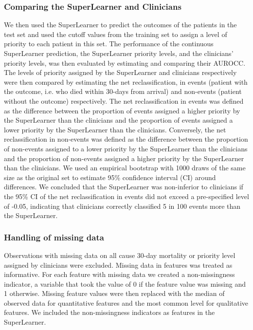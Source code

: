 \documentclass[10pt,letterpaper]{article}\usepackage[]{graphicx}\usepackage[]{color}
\begin{document}
\subsubsection*{Comparing the SuperLearner and Clinicians}
We then used the SuperLearner to predict the outcomes of the patients in the
test set and used the cutoff values from the training set to assign a level of
priority to each patient in this set. The performance of the continuous
SuperLearner prediction, the SuperLearner priority levels, and the clinicians'
priority levels, was then evaluated by estimating and comparing their
AUROCC. The levels of priority assigned by the SuperLearner and clinicians
respectively were then compared by estimating the net reclassification, in
events (patient with the outcome, i.e. who died within 30-days from arrival) and
non-events (patient without the outcome) respectively. The net reclassification
in events was defined as the difference between the proportion of events
assigned a higher priority by the SuperLearner than the clinicians and the
proportion of events assigned a lower priority by the SuperLearner than the
clinicians. Conversely, the net reclassification in non-events was defined as
the difference between the proportion of non-events assigned to a lower priority
by the SuperLearner than the clinicians and the proportion of non-events
assigned a higher priority by the SuperLearner than the clinicians. We used an
empirical bootstrap with 1000 draws of the same size as the original set to
estimate 95\% confidence interval (CI) around differences. We concluded that the
SuperLearner was non-inferior to clinicians if the 95\% CI of the net
reclassification in events did not exceed a pre-specified level of -0.05,
indicating that clinicians correctly classified 5 in 100 events more than the
SuperLearner.

\subsubsection*{Handling of missing data}
Observations with missing data on all cause 30-day mortality or priority level
assigned by clinicians were excluded. Missing data in features was treated as
informative. For each feature with missing data we created a non-missingness
indicator, a variable that took the value of 0 if the feature value was missing
and 1 otherwise. Missing feature values were then replaced with the median of
observed data for quantitative features and the most common level for
qualitative features. We included the non-missingness indicators as features in
the SuperLearner.
\end{document}
